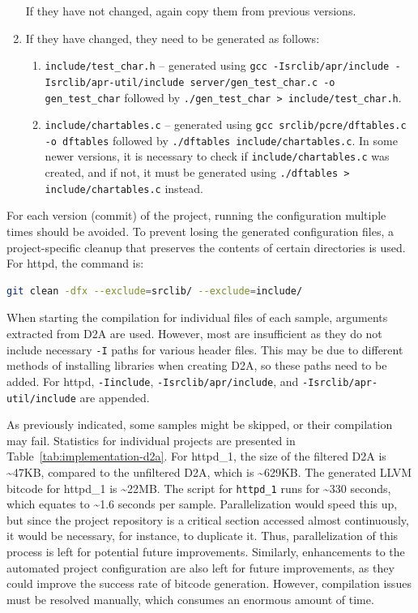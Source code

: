 \begin{enumerate}
\begin{itemize}
    \end{itemize}
    If they have not changed, again copy them from previous versions.
    \item If they have changed, they need to be generated as follows:
    \begin{enumerate}
        \item \texttt{include/test\_char.h} -- generated using \texttt{gcc -Isrclib/apr/include \newline -Isrclib/apr-util/include server/gen\_test\_char.c -o gen\_test\_char} 
        \newline followed by \texttt{./gen\_test\_char > include/test\_char.h}.
        \item \texttt{include/chartables.c} -- generated using \texttt{gcc srclib/pcre/dftables.c -o dftables} followed by \texttt{./dftables include/chartables.c}. In some newer versions, it is necessary to check if \texttt{include/chartables.c} was created, and if not, it must be generated using \texttt{./dftables > include/chartables.c} instead.
    \end{enumerate}
\end{enumerate}

For each version (commit) of the project, running the configuration multiple times should be avoided. To prevent losing the generated configuration files, a project-specific cleanup that preserves the contents of certain directories is used. For httpd, the command is:
\begin{lstlisting}[language=bash, xleftmargin=2em]
git clean -dfx --exclude=srclib/ --exclude=include/
\end{lstlisting}

When starting the compilation for individual files of each sample, arguments extracted from D2A are used. However, most are insufficient as they do not include necessary \texttt{-I} paths for various header files. This may be due to different methods of installing libraries when creating D2A, so these paths need to be added. For httpd, \texttt{-Iinclude}, \texttt{-Isrclib/apr/include}, and \texttt{-Isrclib/apr-util/include} are appended.

As previously indicated, some samples might be skipped, or their compilation may fail. Statistics for individual projects are presented in Table~\ref{tab:implementation-d2a}. For httpd\_1, the size of the filtered D2A is \textasciitilde47KB, compared to the unfiltered D2A, which is \textasciitilde629KB. The generated LLVM bitcode for httpd\_1 is \textasciitilde22MB. The script for \texttt{httpd\_1} runs for \textasciitilde330 seconds, which equates to \textasciitilde1.6 seconds per sample. Parallelization would speed this up, but since the project repository is a critical section accessed almost continuously, it would be necessary, for instance, to duplicate it. Thus, parallelization of this process is left for potential future improvements. Similarly, enhancements to the automated project configuration are also left for future improvements, as they could improve the success rate of bitcode generation. However, compilation issues must be resolved manually, which consumes an enormous amount of time.


